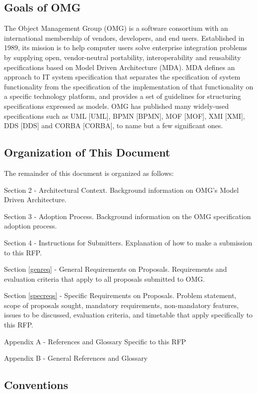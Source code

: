 \subsection{Goals of OMG}
The Object Management Group (OMG) is a software consortium with an international membership of vendors, developers, and end users. Established in 1989, its mission is to help computer users solve enterprise integration problems by supplying open, vendor-neutral portability, interoperability and reusability specifications based on Model Driven Architecture (MDA). MDA defines an approach to IT system specification that separates the specification of system functionality from the specification of the implementation of that functionality on a specific technology platform, and provides a set of guidelines for structuring specifications expressed as models. OMG has published many widely-used specifications such as UML [UML], BPMN [BPMN], MOF [MOF], XMI [XMI], DDS [DDS] and CORBA [CORBA], to name but a few significant ones.

\subsection{Organization of This Document}\label{docorg}
The remainder of this document is organized as follows:

Section 2 - Architectural Context. Background information on OMG's Model Driven Architecture. 

Section 3 - Adoption Process. Background information on the OMG specification adoption process.

Section 4 - Instructions for Submitters. Explanation of how to make a submission to this RFP.

Section \ref{genreq} - General Requirements on Proposals. Requirements and evaluation criteria that apply to all proposals submitted to OMG.

Section \ref{specreqs} - Specific Requirements on Proposals. Problem statement, scope of proposals sought, mandatory requirements, non-mandatory features, issues to be discussed, evaluation criteria, and timetable that apply specifically to this RFP. 

Appendix A - References and Glossary Specific to this RFP

Appendix B - General References and Glossary

\subsection{Conventions}


